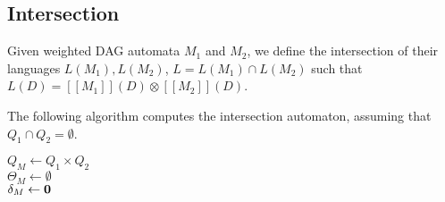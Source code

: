\documentclass[11pt]{article}
\begin{document}
\subsection{Intersection}
Given weighted DAG automata $M_1$ and $M_2$, we define the intersection of their
languages $L(M_1), L(M_2)$, $L = L(M_1) \cap L(M_2)$ such that $L(D) = [[M_1]](D) \otimes
[[M_2]](D)$. 

The following algorithm computes the intersection automaton, assuming that $Q_1 \cap
Q_2 = \emptyset$.

\begin{algorithm}[!h]
  \caption{$\textsc{Intersect}(M_1 = \langle \Sigma, Q_1, \Theta_1, \delta_1, \K
  \rangle, M_2 = \langle \Sigma, Q_2, \Theta_2, \delta_2, \K \rangle)$}
	\label{alg:naiveintersect}
  $Q_M \gets Q_1 \times Q_2$\\
  $\Theta_M \gets \emptyset$\\
  $\delta_M \gets \boldsymbol{0}$\\
   
\end{algorithm}
\end{document}
